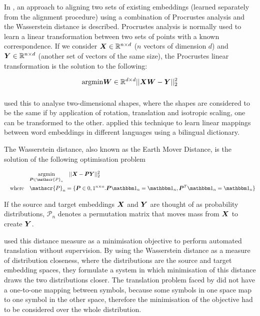 In \cite{UnsupervisedAlignmentWP}, an approach to aligning two sets of existing embeddings (learned separately from the alignment procedure) using a combination of Procrustes analysis and the Wasserstein distance is described. Procrustes analysis is normally used to learn a linear transformation between two sets of points with a known correspondence. If we consider $\boldsymbol{X} \in \mathbb{R}^{n \times d}$ ($n$ vectors of dimension $d$) and $\boldsymbol{Y} \in \mathbb{R}^{n \times d}$ (another set of vectors of the same size), the Procrustes linear transformation is the solution to the following:

\begin{equation}
    \underset{\quad}{\operatorname{argmin}}{\boldsymbol{W} \in \mathbb{R}^{d \times d}}  ||\boldsymbol{X} \boldsymbol{W} - \boldsymbol{Y}||_2^2
\end{equation}

\cite{Goodall1991MI} used this to analyse two-dimensional shapes, where the shapes are considered to be the same if by application of rotation, translation and isotropic scaling, one can be transformed to the other. \cite{MikolovMachineTranslation} applied this technique to learn linear mappings between word embeddings in different languages using a bilingual dictionary. 

The Wasserstein distance, also known as the Earth Mover Distance, is the solution of the following optimisation problem

\begin{equation}
\begin{split}
    &\argmin{\vecP \in \mathscr{P}_n} \quad || \vecX - \vecP \vecY ||_2^2 \\
    \spaced{where}&\mathscr{P}_n = \{\vecP \in {0, 1}^{n \times n}. \vecP \one_n = \one_n, \vecP^T \one_n = \one_n \}
\end{split}
\end{equation}

If the source and target embeddings $\boldsymbol{X}$ and $\boldsymbol{Y}$ are thought of as probability distributions, $\mathscr{P}_n$ denotes a permutation matrix that moves mass from $\boldsymbol{X}$ to create $\boldsymbol{Y}$. 

\cite{Zhang2017EarthMD} used this distance measure as a minimisation objective to perform automated translation without supervision. By using the Wasserstein distance as a measure of distribution closeness, where the distributions are the source and target embedding spaces, they formulate a system in which minimisation of this distance draws the two distributions closer. The translation problem faced by \cite{Zhang2017EarthMD} did not have a one-to-one mapping between symbols, because some symbols in one space map to one symbol in the other space, therefore the minimisation of the objective had to be considered over the whole distribution. 

